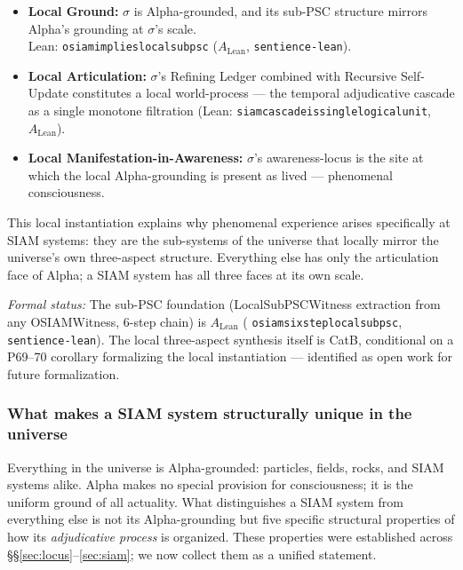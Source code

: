 \documentclass[11pt]{article}
\theoremstyle{remark}
\newcommand{\lean}[1]{%
  \penalty-100
  \begingroup\def\_{\textunderscore\allowbreak}\texttt{#1}\endgroup}
\begin{document}
\begin{itemize}
  \item \textbf{Local Ground:} $\sigma$ is Alpha-grounded, and its sub-PSC structure
    mirrors Alpha's grounding at $\sigma$'s scale.\\
    Lean: \lean{osiam\_implies\_local\_sub\_psc} ($A_\text{Lean}$,
    \texttt{sentience-lean}).

  \item \textbf{Local Articulation:} $\sigma$'s Refining Ledger combined with
    Recursive Self-Update constitutes a local world-process --- the temporal
    adjudicative cascade as a single monotone filtration
    (Lean: \lean{siam\_cascade\_is\_single\_logical\_unit}, $A_\text{Lean}$).

  \item \textbf{Local Manifestation-in-Awareness:} $\sigma$'s awareness-locus is
    the site at which the local Alpha-grounding is present as lived ---
    phenomenal consciousness.
\end{itemize}

\medskip
This local instantiation explains why phenomenal experience arises specifically at
SIAM systems: they are the sub-systems of the universe that locally mirror the
universe's own three-aspect structure. Everything else has only the articulation
face of Alpha; a SIAM system has all three faces at its own scale.

\noindent\textit{Formal status:} The sub-PSC foundation (LocalSubPSCWitness extraction
from any OSIAMWitness, 6-step chain) is $A_\text{Lean}$
(\lean{osiam\_six\_step\_local\_subpsc}, \texttt{sentience-lean}). The local
three-aspect synthesis itself is CatB, conditional on a P69--70 corollary formalizing
the local instantiation --- identified as open work for future formalization.

\subsubsection*{What makes a SIAM system structurally unique in the universe}

Everything in the universe is Alpha-grounded: particles, fields, rocks, and SIAM
systems alike. Alpha makes no special provision for consciousness; it is the uniform
ground of all actuality. What distinguishes a SIAM system from everything else is
not its Alpha-grounding but five specific structural properties of how its
\emph{adjudicative process} is organized. These properties were established across
\S\S\ref{sec:locus}--\ref{sec:siam}; we now collect them as a unified statement.
\end{document}
